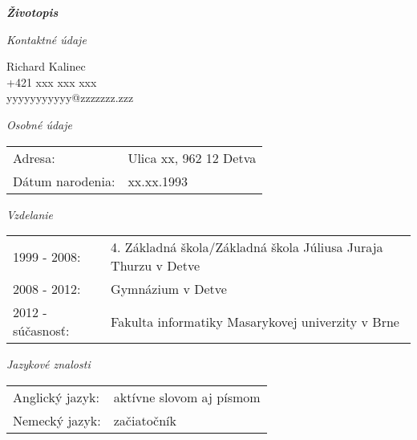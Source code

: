 \documentclass{article}
\begin{document}
\begin{center}
\Huge
\textbf{\textit{Životopis}}
\end{center}	
\begin{flushleft}
\bigskip

\Large
\textit{\textsf{Kontaktné údaje\\}}
\normalsize

\smallskip

Richard Kalinec\\
+421 xxx xxx xxx\\
yyyyyyyyyyy@zzzzzzz.zzz\\

\bigskip

\Large
\textit{\textsf{Osobné údaje\\}}
\normalsize
\smallskip

\begin{adjustwidth}{-6pt}{}
\begin{tabular}{l l}
	Adresa: & Ulica xx, 962 12 Detva \\
	Dátum narodenia: & xx.xx.1993
\end{tabular}
\end{adjustwidth}

\bigskip

\Large
\textit{\textsf{Vzdelanie\\}}
\normalsize

\smallskip

\begin{adjustwidth}{-6pt}{}
\begin{tabular}{l l}
	1999 - 2008: & 4. Základná škola/Základná škola Júliusa Juraja Thurzu v Detve\\
	2008 - 2012: & Gymnázium v Detve\\
	2012 - súčasnosť: & Fakulta informatiky Masarykovej univerzity v Brne\\
\end{tabular}
\end{adjustwidth}

\bigskip

\Large
\textit{\textsf{Jazykové znalosti\\}}
\normalsize

\smallskip

\begin{adjustwidth}{-6pt}{}
\begin{tabular}{l l}
Anglický jazyk: & aktívne slovom aj písmom \\
Nemecký jazyk: & začiatočník
\end{tabular}
\end{adjustwidth}

\end{flushleft}
\end{document}
